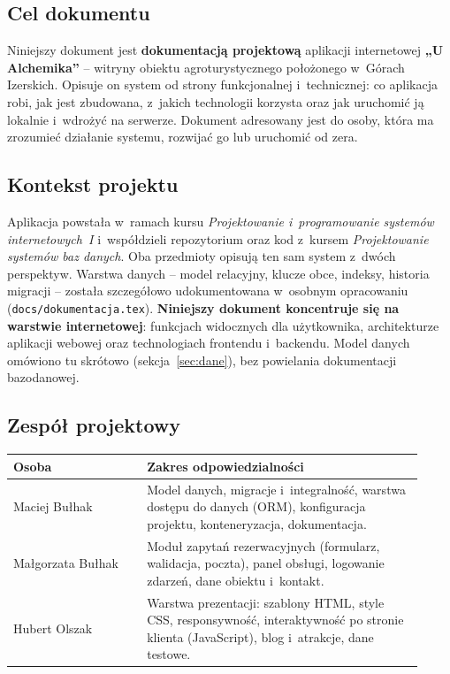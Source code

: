 \documentclass[12pt,a4paper]{article}
\begin{document}
\subsection{Cel dokumentu}

Niniejszy dokument jest \textbf{dokumentacją projektową} aplikacji internetowej
\textbf{„U Alchemika”} -- witryny obiektu agroturystycznego położonego w~Górach
Izerskich. Opisuje on system od strony funkcjonalnej i~technicznej: co aplikacja
robi, jak jest zbudowana, z~jakich technologii korzysta oraz jak uruchomić ją
lokalnie i~wdrożyć na serwerze. Dokument adresowany jest do osoby, która ma
zrozumieć działanie systemu, rozwijać go lub uruchomić od zera.

\subsection{Kontekst projektu}

Aplikacja powstała w~ramach kursu \emph{Projektowanie i~programowanie systemów
internetowych~I} i~współdzieli repozytorium oraz kod z~kursem \emph{Projektowanie
systemów baz danych}. Oba przedmioty opisują ten sam system z~dwóch perspektyw.
Warstwa danych -- model relacyjny, klucze obce, indeksy, historia migracji --
została szczegółowo udokumentowana w~osobnym opracowaniu
(\texttt{docs/dokumentacja.tex}). \textbf{Niniejszy dokument koncentruje się na
warstwie internetowej}: funkcjach widocznych dla użytkownika, architekturze
aplikacji webowej oraz technologiach frontendu i~backendu. Model danych omówiono
tu skrótowo (sekcja~\ref{sec:dane}), bez powielania dokumentacji bazodanowej.

\subsection{Zespół projektowy}

\begin{longtable}{p{0.30\linewidth}p{0.62\linewidth}}
\toprule
\textbf{Osoba} & \textbf{Zakres odpowiedzialności} \\
\midrule
\endhead
Maciej Bułhak & Model danych, migracje i~integralność, warstwa dostępu do danych
  (ORM), konfiguracja projektu, konteneryzacja, dokumentacja. \\[4pt]
Małgorzata Bułhak & Moduł zapytań rezerwacyjnych (formularz, walidacja, poczta),
  panel obsługi, logowanie zdarzeń, dane obiektu i~kontakt. \\[4pt]
Hubert Olszak & Warstwa prezentacji: szablony HTML, style CSS, responsywność,
  interaktywność po stronie klienta (JavaScript), blog i~atrakcje, dane testowe. \\
\bottomrule
\end{longtable}
\end{document}
